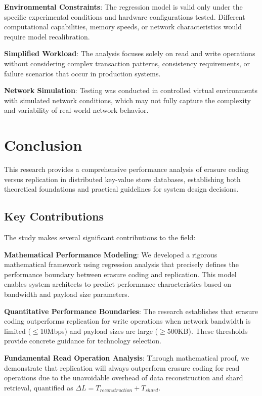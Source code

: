 \textbf{Environmental Constraints}: The regression model is valid only under the specific experimental conditions and hardware configurations tested. Different computational capabilities, memory speeds, or network characteristics would require model recalibration.

\textbf{Simplified Workload}: The analysis focuses solely on read and write operations without considering complex transaction patterns, consistency requirements, or failure scenarios that occur in production systems.

\textbf{Network Simulation}: Testing was conducted in controlled virtual environments with simulated network conditions, which may not fully capture the complexity and variability of real-world network behavior.

\section{Conclusion}

This research provides a comprehensive performance analysis of erasure coding versus replication in distributed key-value store databases, establishing both theoretical foundations and practical guidelines for system design decisions.

\subsection{Key Contributions}

The study makes several significant contributions to the field:

\textbf{Mathematical Performance Modeling}: We developed a rigorous mathematical framework using regression analysis that precisely defines the performance boundary between erasure coding and replication. This model enables system architects to predict performance characteristics based on bandwidth and payload size parameters.

\textbf{Quantitative Performance Boundaries}: The research establishes that erasure coding outperforms replication for write operations when network bandwidth is limited ($\leq$10Mbps) and payload sizes are large ($\geq$500KB). These thresholds provide concrete guidance for technology selection.

\textbf{Fundamental Read Operation Analysis}: Through mathematical proof, we demonstrate that replication will always outperform erasure coding for read operations due to the unavoidable overhead of data reconstruction and shard retrieval, quantified as $\Delta L = T_{reconstruction} + T_{shard}$.


